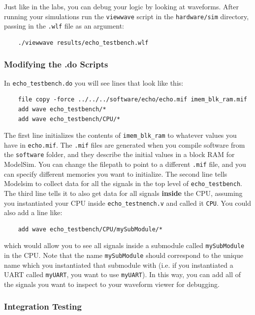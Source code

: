 \documentclass[11pt]{article}
\begin{document}
Just like in the labs, you can debug your logic by looking at waveforms. After running your simulations run the \verb|viewwave| script in the \verb|hardware/sim| directory, passing in the \verb|.wlf| file as an argument:

\begin{verbatim}
	./viewwave results/echo_testbench.wlf
\end{verbatim}

\subsubsection{Modifying the .do Scripts}

In \verb|echo_testbench.do| you will see lines that look like this:
\begin{verbatim}
	file copy -force ../../../software/echo/echo.mif imem_blk_ram.mif
	add wave echo_testbench/*
	add wave echo_testbench/CPU/*
\end{verbatim}

The first line initializes the contents of \verb|imem_blk_ram| to whatever values you have in \verb|echo.mif|. The \verb|.mif| files are generated when you compile software from the \verb|software| folder, and they describe the initial values in a block RAM for ModelSim. You can change the filepath to point to a different \verb|.mif| file, and you can specify different memories you want to initialize. The second line tells Modelsim to collect data for all the signals in the top level of \verb|echo_testbench|. The third line tells it to also get data for all signals \textbf{inside} the CPU, assuming you instantiated your CPU inside \verb|echo_testnench.v| and called it \verb|CPU|. You could also add a line like:

\begin{verbatim}
	add wave echo_testbench/CPU/mySubModule/*
\end{verbatim}

which would allow you to see all signals inside a submodule called \verb|mySubModule| in the CPU. Note that the name \verb|mySubModule| should correspond to the unique name which you instantiated that submodule with (i.e. if you instantiated a UART called \verb|myUART|, you want to use \verb|myUART|). In this way, you can add all of the signals you want to inspect to your waveform viewer for debugging.

\subsubsection{Integration Testing}
\end{document}

